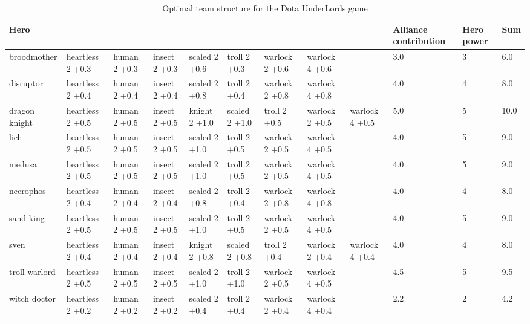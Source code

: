 \documentclass{article}
\begin{document}
\begin{table}
\resizebox{16cm}{!} {
\begin{tabular}{l| *{8}{p{1.6cm}} | *{3}{ p{1cm}} }
{Hero} &                   &               &                &                &                &                  &                  &                  &  Alliance contribution &  Hero power &   Sum \\
\midrule
broodmother   &  heartless 2 +0.3  &  human 2 +0.3  &  insect 2 +0.3  &  scaled 2 +0.6  &   troll 2 +0.3  &  warlock  2 +0.6  &  warlock  4 +0.6  &                   &                  3.0 &           3 &   6.0 \\
disruptor     &  heartless 2 +0.4  &  human 2 +0.4  &  insect 2 +0.4  &  scaled 2 +0.8  &   troll 2 +0.4  &  warlock  2 +0.8  &  warlock  4 +0.8  &                   &                  4.0 &           4 &   8.0 \\
dragon knight &  heartless 2 +0.5  &  human 2 +0.5  &  insect 2 +0.5  &  knight 2 +1.0  &  scaled 2 +1.0  &     troll 2 +0.5  &  warlock  2 +0.5  &  warlock  4 +0.5  &                  5.0 &           5 &  10.0 \\
lich          &  heartless 2 +0.5  &  human 2 +0.5  &  insect 2 +0.5  &  scaled 2 +1.0  &   troll 2 +0.5  &  warlock  2 +0.5  &  warlock  4 +0.5  &                   &                  4.0 &           5 &   9.0 \\
medusa        &  heartless 2 +0.5  &  human 2 +0.5  &  insect 2 +0.5  &  scaled 2 +1.0  &   troll 2 +0.5  &  warlock  2 +0.5  &  warlock  4 +0.5  &                   &                  4.0 &           5 &   9.0 \\
necrophos     &  heartless 2 +0.4  &  human 2 +0.4  &  insect 2 +0.4  &  scaled 2 +0.8  &   troll 2 +0.4  &  warlock  2 +0.8  &  warlock  4 +0.8  &                   &                  4.0 &           4 &   8.0 \\
sand king     &  heartless 2 +0.5  &  human 2 +0.5  &  insect 2 +0.5  &  scaled 2 +1.0  &   troll 2 +0.5  &  warlock  2 +0.5  &  warlock  4 +0.5  &                   &                  4.0 &           5 &   9.0 \\
sven          &  heartless 2 +0.4  &  human 2 +0.4  &  insect 2 +0.4  &  knight 2 +0.8  &  scaled 2 +0.8  &     troll 2 +0.4  &  warlock  2 +0.4  &  warlock  4 +0.4  &                  4.0 &           4 &   8.0 \\
troll warlord &  heartless 2 +0.5  &  human 2 +0.5  &  insect 2 +0.5  &  scaled 2 +1.0  &   troll 2 +1.0  &  warlock  2 +0.5  &  warlock  4 +0.5  &                   &                  4.5 &           5 &   9.5 \\
witch doctor  &  heartless 2 +0.2  &  human 2 +0.2  &  insect 2 +0.2  &  scaled 2 +0.4  &   troll 2 +0.4  &  warlock  2 +0.4  &  warlock  4 +0.4  &                   &                  2.2 &           2 &   4.2 \\
\bottomrule
\end{tabular}
}
\caption{Optimal team structure for the Dota UnderLords game }
\label{table:solution}
\end{table}
\end{document}

